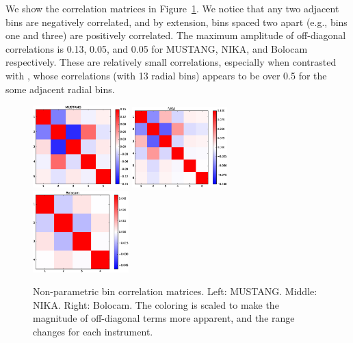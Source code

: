 \documentclass[onecolumn,traditabstract]{aa}
\begin{document}
We show the correlation matrices in Figure~\ref{fig:corr_matrices}. We notice
that any two adjacent bins are negatively correlated, and by extension, bins spaced two apart (e.g., bins one and three) are positively
correlated. The maximum amplitude of off-diagonal correlations is 0.13, 0.05, and 0.05 for MUSTANG, NIKA, and Bolocam respectively.
These are relatively small correlations, especially when contrasted with \citet{sayers2013}, whose correlations (with 13 radial bins)
appears to be over 0.5 for the some adjacent radial bins.

\begin{figure}[h]
  \centering
  \includegraphics[width=0.33\textwidth]{NIKA_ml_deproj_figs/Real_Joint_gNFW_Real_11011111_2500S_500B_100W_MUSTANG_correlation_matrix_clim_bwr.eps}
  \includegraphics[width=0.33\textwidth]{NIKA_ml_deproj_figs/Real_Joint_gNFW_Real_11011111_2500S_500B_100W_NIKA_correlation_matrix_clim_bwr.eps}
  \includegraphics[width=0.33\textwidth]{NIKA_ml_deproj_figs/Real_Joint_gNFW_Real_11011111_2500S_500B_100W_Bolocam_correlation_matrix_clim_bwr.eps}
  \caption{Non-parametric bin correlation matrices. Left: MUSTANG. Middle: NIKA. Right: Bolocam. The coloring is
    scaled to make the magnitude of off-diagonal terms more apparent, and the range changes for each instrument.}
  \label{fig:corr_matrices}
\end{figure}
\end{document}

